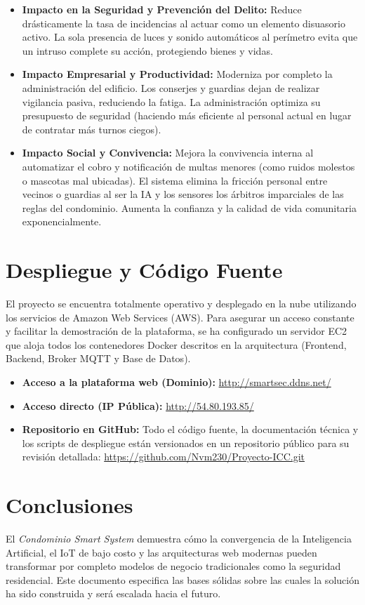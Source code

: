 \documentclass[12pt,a4paper]{article}
\begin{document}
\begin{itemize}
    \item \textbf{Impacto en la Seguridad y Prevención del Delito:} Reduce drásticamente la tasa de incidencias al actuar como un elemento disuasorio activo. La sola presencia de luces y sonido automáticos al perímetro evita que un intruso complete su acción, protegiendo bienes y vidas.
    \item \textbf{Impacto Empresarial y Productividad:} Moderniza por completo la administración del edificio. Los conserjes y guardias dejan de realizar vigilancia pasiva, reduciendo la fatiga. La administración optimiza su presupuesto de seguridad (haciendo más eficiente al personal actual en lugar de contratar más turnos ciegos).
    \item \textbf{Impacto Social y Convivencia:} Mejora la convivencia interna al automatizar el cobro y notificación de multas menores (como ruidos molestos o mascotas mal ubicadas). El sistema elimina la fricción personal entre vecinos o guardias al ser la IA y los sensores los árbitros imparciales de las reglas del condominio. Aumenta la confianza y la calidad de vida comunitaria exponencialmente.
\end{itemize}

\section{Despliegue y Código Fuente}
El proyecto se encuentra totalmente operativo y desplegado en la nube utilizando los servicios de Amazon Web Services (AWS). Para asegurar un acceso constante y facilitar la demostración de la plataforma, se ha configurado un servidor EC2 que aloja todos los contenedores Docker descritos en la arquitectura (Frontend, Backend, Broker MQTT y Base de Datos).

\begin{itemize}
    \item \textbf{Acceso a la plataforma web (Dominio):} \url{http://smartsec.ddns.net/}
    \item \textbf{Acceso directo (IP Pública):} \url{http://54.80.193.85/}
    \item \textbf{Repositorio en GitHub:} Todo el código fuente, la documentación técnica y los scripts de despliegue están versionados en un repositorio público para su revisión detallada: \url{https://github.com/Nvm230/Proyecto-ICC.git}
\end{itemize}

\section{Conclusiones}
El \textit{Condominio Smart System} demuestra cómo la convergencia de la Inteligencia Artificial, el IoT de bajo costo y las arquitecturas web modernas pueden transformar por completo modelos de negocio tradicionales como la seguridad residencial. Este documento especifica las bases sólidas sobre las cuales la solución ha sido construida y será escalada hacia el futuro.
\end{document}
